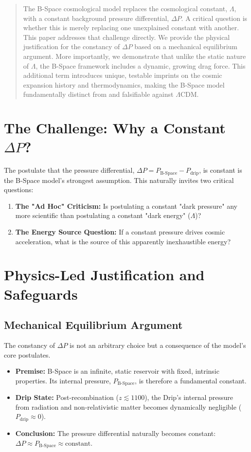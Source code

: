 \documentclass{BSpacePaper} %
\begin{document}
\makeBSCSsupplementtitle

\begin{abstract}
\noindent
The B-Space cosmological model replaces the cosmological constant, \(\Lambda\), with a constant background pressure differential, $\Delta P$. A critical question is whether this is merely replacing one unexplained constant with another. This paper addresses that challenge directly. We provide the physical justification for the constancy of $\Delta P$ based on a mechanical equilibrium argument. More importantly, we demonstrate that unlike the static nature of \(\Lambda\), the B-Space framework includes a dynamic, growing drag force. This additional term introduces unique, testable imprints on the cosmic expansion history and thermodynamics, making the B-Space model fundamentally distinct from and falsifiable against \(\Lambda\)CDM.
\end{abstract}

\section{The Challenge: Why a Constant $\Delta P$?}
The postulate that the pressure differential, $\Delta P = P_{\text{B-Space}} - P_{\text{drip}}$, is constant is the B-Space model's strongest assumption. This naturally invites two critical questions:
\begin{enumerate}
    \item \textbf{The "Ad Hoc" Criticism:} Is postulating a constant "dark pressure" any more scientific than postulating a constant "dark energy" (\(\Lambda\))?
    \item \textbf{The Energy Source Question:} If a constant pressure drives cosmic acceleration, what is the source of this apparently inexhaustible energy?
\end{enumerate}

\section{Physics-Led Justification and Safeguards}

\subsection{Mechanical Equilibrium Argument}
The constancy of $\Delta P$ is not an arbitrary choice but a consequence of the model's core postulates.
\begin{itemize}
    \item \textbf{Premise:} B-Space is an infinite, static reservoir with fixed, intrinsic properties. Its internal pressure, $P_{\text{B-Space}}$, is therefore a fundamental constant.
    \item \textbf{Drip State:} Post-recombination ($z \lesssim 1100$), the Drip's internal pressure from radiation and non-relativistic matter becomes dynamically negligible ($P_{\text{drip}} \approx 0$).
    \item \textbf{Conclusion:} The pressure differential naturally becomes constant: $\Delta P \approx P_{\text{B-Space}} \approx \text{constant}$.
\end{itemize}
\end{document}
